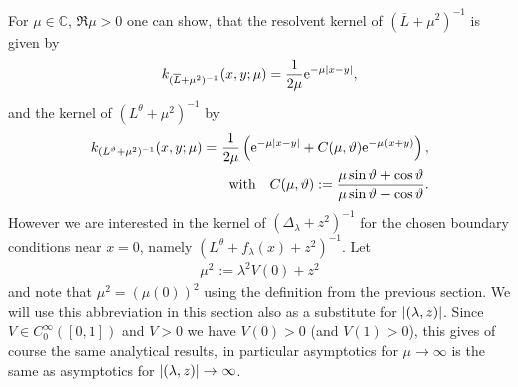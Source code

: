 For $\mu\in\mathbb{C}$, $\Re\mu > 0$ one can show, that the resolvent kernel of
$(\overline L + \mu^2)^{-1}$ is given by
\begin{align}
  k_{(\overline L + \mu^2)^{-1}}(x,y;\mu) = \frac1{2\mu}\mathrm e^{-\mu\left|x-y\right|},
\end{align}
and the kernel of $(L^\theta+\mu^2)^{-1}$ by
\begin{align}
  \label{frm:k-l-theta}
  k_{(L^\vartheta +\mu^2)^{-1}}(x,y;\mu) = \frac1{2\mu} \left( \mathrm e^{-\mu\left|x-y\right|} +
  C(\mu,\vartheta)\mathrm e^{-\mu(x+y)}\right), \\
  \label{frm:c-mu-theta}
  \text{with} \quad C(\mu,\vartheta) :=
  \frac{\mu\sin\vartheta+\cos\vartheta}{\mu\sin\vartheta-\cos\vartheta}.
\end{align}
However we are interested in the kernel of $(\Delta_\lambda + z^2)^{-1}$ for the
chosen boundary conditions near $x = 0$, namely $(L^\theta + f_\lambda(x) +
z^2)^{-1}$. Let
\begin{align}
  \label{def:mu}
  \mu^2 := \lambda^2 V(0) + z^2
\end{align}
and note that $\mu^2 = (\mu(0))^2$ using the definition from the previous
section. We will use this abbreviation in this section also as a substitute for
$\left|(\lambda,z)\right|$. Since $V\in C_0^\infty([0,1])$ and $V > 0$ we have $V(0) >
0$ (and $V(1) > 0$), this gives of course the same analytical results, in
particular asymptotics for $\mu\to\infty$ is the same as asymptotics for
$\left|(\lambda,z)\right|\to\infty$.

